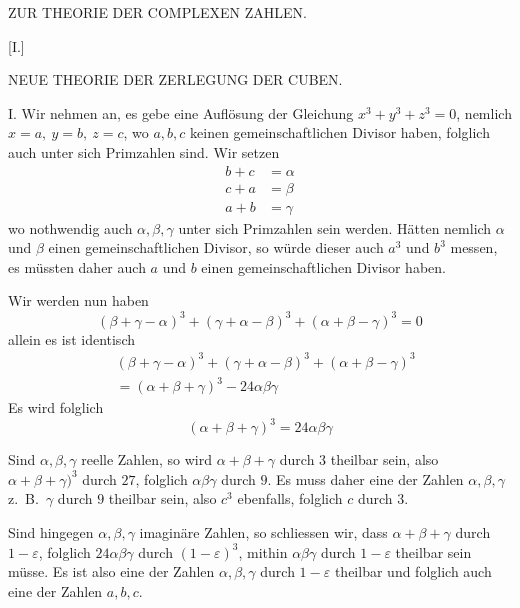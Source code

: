 %

%
\clearpage
\renewcommand{\BookRunningTitle}{Zur Theorie der complexen Zahlen}
\begin{center}\Large ZUR THEORIE DER COMPLEXEN ZAHLEN.\end{center}
\begin{center}[I.]\par\medskip\large NEUE THEORIE DER ZERLEGUNG DER CUBEN.\end{center}

I. Wir nehmen an, es gebe eine Auflösung der Gleichung $x^3+y^3+z^3=0$, nemlich $x=a,\ y=b,\ z=c$, wo $a,b,c$ keinen gemeinschaftlichen Divisor haben, folglich auch unter sich Primzahlen sind. Wir setzen
\[
\begin{aligned}
b+c&=\alpha\\
c+a&=\beta\\
a+b&=\gamma
\end{aligned}
\]
wo nothwendig auch $\alpha,\beta,\gamma$ unter sich Primzahlen sein werden. Hätten nemlich $\alpha$ und $\beta$ einen gemeinschaftlichen Divisor, so würde dieser auch $a^3$ und $b^3$ messen, es müssten daher auch $a$ und $b$ einen gemeinschaftlichen Divisor haben.

Wir werden nun haben
\[
(\beta+\gamma-\alpha)^3+(\gamma+\alpha-\beta)^3+(\alpha+\beta-\gamma)^3=0
\]
allein es ist identisch
\[
\begin{aligned}
&(\beta+\gamma-\alpha)^3+(\gamma+\alpha-\beta)^3+(\alpha+\beta-\gamma)^3\\
&=(\alpha+\beta+\gamma)^3-24\alpha\beta\gamma
\end{aligned}
\]
Es wird folglich
\[
(\alpha+\beta+\gamma)^3=24\alpha\beta\gamma
\]

%
Sind $\alpha,\beta,\gamma$ reelle Zahlen, so wird $\alpha+\beta+\gamma$ durch $3$ theilbar sein, also $\alpha+\beta+\gamma)^3$ durch $27$, folglich $\alpha\beta\gamma$ durch $9$. Es muss daher eine der Zahlen $\alpha,\beta,\gamma$ z.\ B.\ $\gamma$ durch $9$ theilbar sein, also $c^3$ ebenfalls, folglich $c$ durch $3$.

Sind hingegen $\alpha,\beta,\gamma$ imaginäre Zahlen, so schliessen wir, dass $\alpha+\beta+\gamma$ durch $1-\varepsilon$, folglich $24\alpha\beta\gamma$ durch $(1-\varepsilon)^3$, mithin $\alpha\beta\gamma$ durch $1-\varepsilon$ theilbar sein müsse. Es ist also eine der Zahlen $\alpha,\beta,\gamma$ durch $1-\varepsilon$ theilbar und folglich auch eine der Zahlen $a,b,c$.


